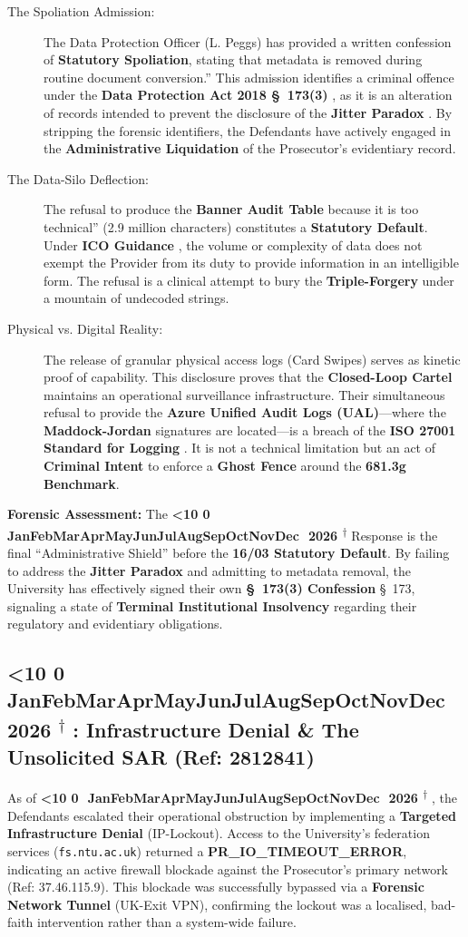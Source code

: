 \documentclass{EMBASSY}
\DeclareRobustCommand{\gmt}[3]{%
    \texorpdfstring{%
        {\color{DateGold}\textbf{%
            \ifnum#1<10 0\fi#1\,\textperiodcentered\,%
            \ifcase#2\or Jan\or Feb\or Mar\or Apr\or May\or Jun\or Jul\or Aug\or Sep\or Oct\or Nov\or Dec\fi
            \,\textperiodcentered\,20#3%
            \textsuperscript{$\dagger$}%
        }}%
    }{%
        (#1/#2/#3)%
    }%
}
\begin{document}
\begin{description}
	\item[The Spoliation Admission:] The Data Protection Officer (L. Peggs) has provided a written confession of \textbf{Statutory Spoliation}, stating that metadata is removed during routine document conversion.'' This admission identifies a criminal offence under the \textbf{Data Protection Act 2018 \S~173(3)} \cite{DPA18}, as it is an alteration of records intended to prevent the disclosure of the \textbf{Jitter Paradox} \cite{FCA81}. By stripping the forensic identifiers, the Defendants have actively engaged in the \textbf{Administrative Liquidation} of the Prosecutor's evidentiary record.
	\item[The Data-Silo Deflection:] The refusal to produce the \textbf{Banner Audit Table} because it is too technical'' (2.9 million characters) constitutes a \textbf{Statutory Default}. Under \textbf{ICO Guidance} \cite{ICO-SAR-Guidance}, the volume or complexity of data does not exempt the Provider from its duty to provide information in an intelligible form. The refusal is a clinical attempt to bury the \textbf{Triple-Forgery} under a mountain of undecoded strings.
	\item[Physical vs. Digital Reality:] The release of granular physical access logs (Card Swipes) serves as kinetic proof of capability. This disclosure proves that the \textbf{Closed-Loop Cartel} maintains an operational surveillance infrastructure. Their simultaneous refusal to provide the \textbf{Azure Unified Audit Logs (UAL)}---where the \textbf{Maddock-Jordan} signatures are located---is a breach of the \textbf{ISO 27001 Standard for Logging} \cite{ISO27001-Audit}. It is not a technical limitation but an act of \textbf{Criminal Intent} to enforce a \textbf{Ghost Fence} around the \textbf{681.3g Benchmark}.
\end{description}

\noindent\textbf{Forensic Assessment:} The \gmt{13}{3}{26} Response is the final ``Administrative Shield'' before the \textbf{16/03 Statutory Default}. By failing to address the \textbf{Jitter Paradox} and admitting to metadata removal, the University has effectively signed their own \textbf{\S~173(3) Confession} \cite{DPA18} \S~173, signaling a state of \textbf{Terminal Institutional Insolvency} regarding their regulatory and evidentiary obligations.

\subsection{\gmt{15}{3}{26}: Infrastructure Denial \& The Unsolicited SAR (Ref: 2812841)}
As of \gmt{15}{3}{26}, the Defendants escalated their operational obstruction by implementing a \textbf{Targeted Infrastructure Denial} (IP-Lockout). Access to the University’s federation services (\texttt{fs.ntu.ac.uk}) returned a \textbf{PR\_IO\_TIMEOUT\_ERROR}, indicating an active firewall blockade against the Prosecutor’s primary network (Ref: 37.46.115.9). This blockade was successfully bypassed via a \textbf{Forensic Network Tunnel} (UK-Exit VPN), confirming the lockout was a localised, bad-faith intervention rather than a system-wide failure.
\end{document}
